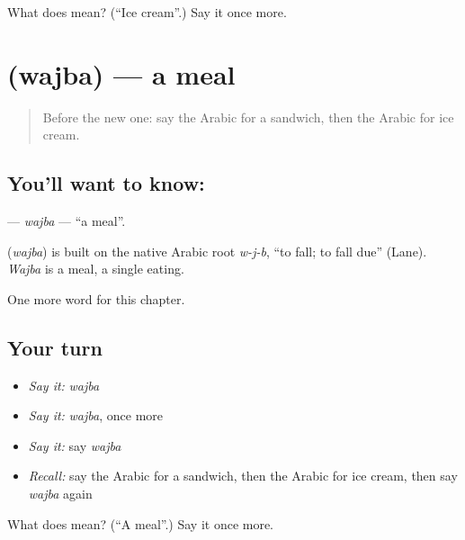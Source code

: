 \begin{tcolorbox}[breakable,colback=teal!4,colframe=teal!35!black,title={Before you move on}]
What does  mean? (\textquotedblleft{}Ice cream\textquotedblright{}.) Say it once more.
\end{tcolorbox}
\section[\texorpdfstring{\ar{وجبة} (wajba)}{وجبة (wajba)}]{ (wajba) — a meal}

\label{lesson:AR-C182-wajba}



\begin{quote}
Before the new one: say the Arabic for a sandwich, then the Arabic for ice cream.
\end{quote}

\subsection*{You'll want to know: }
\textbf{} — \emph{wajba} — \textquotedblleft{}a meal\textquotedblright{}.

\begin{cousinweb}
\textbf{} (\emph{wajba}) is built on the native Arabic root \emph{w-j-b}, \textquotedblleft{}to fall; to fall due\textquotedblright{} (Lane). \emph{Wajba} is a meal, a single eating.
\end{cousinweb}

\begin{grammarlens}[title={What you've built}]
One more word for this chapter.
\end{grammarlens}

\subsection*{Your turn}
\begin{itemize}
\raggedright
  \item \emph{Say it:} \emph{wajba}
  \item \emph{Say it:} \emph{wajba}, once more
  \item \emph{Say it:} say \emph{wajba}
  \item \emph{Recall:} say the Arabic for a sandwich, then the Arabic for ice cream, then say \emph{wajba} again
\end{itemize}

\begin{tcolorbox}[breakable,colback=teal!4,colframe=teal!35!black,title={Before you move on}]
What does  mean? (\textquotedblleft{}A meal\textquotedblright{}.) Say it once more.
\end{tcolorbox}
